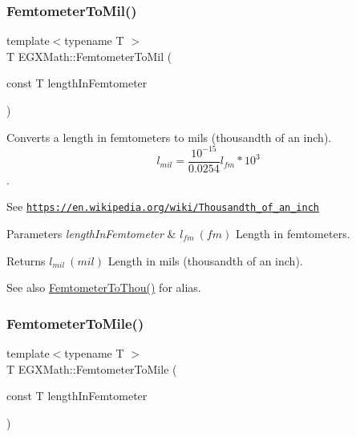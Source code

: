 \subsubsection{\texorpdfstring{Femtometer\+To\+Mil()}{FemtometerToMil()}}
{\footnotesize\ttfamily template$<$typename T $>$ \\
T E\+G\+X\+Math\+::\+Femtometer\+To\+Mil (\begin{DoxyParamCaption}\item[{const T}]{length\+In\+Femtometer }\end{DoxyParamCaption})}



Converts a length in femtometers to mils (thousandth of an inch). \[ l_{mil}= \frac{10^{-15}}{0.0254} l_{fm} * 10^{3} \]. 

See \href{https://en.wikipedia.org/wiki/Thousandth_of_an_inch}{\tt https\+://en.\+wikipedia.\+org/wiki/\+Thousandth\+\_\+of\+\_\+an\+\_\+inch} 
\begin{DoxyParams}{Parameters}
{\em length\+In\+Femtometer} & $ l_{fm}\ (fm)$ Length in femtometers. \\
\hline
\end{DoxyParams}
\begin{DoxyReturn}{Returns}
$ l_{mil}\ (mil)$ Length in mils (thousandth of an inch). 
\end{DoxyReturn}
\begin{DoxySeeAlso}{See also}
\mbox{\hyperlink{group___e_g_x_math-_conversions-_length_conversions-_s_i-_femtometer-_imperial_ga5c277d07215ad164ba2ad94e25b02ff1}{Femtometer\+To\+Thou()}} for alias. 
\end{DoxySeeAlso}
\mbox{\label{group___e_g_x_math-_conversions-_length_conversions-_s_i-_femtometer-_imperial_ga8973c4ada3a3bc89034978a0ba7c2693}} 
\subsubsection{\texorpdfstring{Femtometer\+To\+Mile()}{FemtometerToMile()}}
{\footnotesize\ttfamily template$<$typename T $>$ \\
T E\+G\+X\+Math\+::\+Femtometer\+To\+Mile (\begin{DoxyParamCaption}\item[{const T}]{length\+In\+Femtometer }\end{DoxyParamCaption})}



